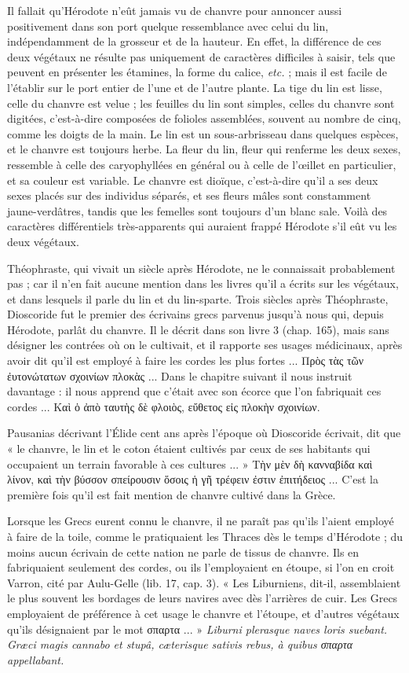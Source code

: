\documentclass[a4paper, 11pt, oneside, polutonikogreek]{article}
\begin{document}
Il fallait qu'Hérodote n'eût jamais vu de chanvre pour annoncer aussi positivement dans son port quelque ressemblance avec celui du lin, indépendamment de la grosseur et de la hauteur. En effet, la différence de ces deux végétaux ne résulte pas uniquement de caractères difficiles à saisir, tels que peuvent en présenter les étamines, la forme du calice, \emph{etc.} ; mais il est facile de l'établir sur le port entier de l'une et de l'autre plante. La tige du lin est lisse, celle du chanvre est velue ; les feuilles du lin sont simples, celles du chanvre sont digitées, c'est-à-dire composées de folioles assemblées, souvent au nombre de cinq, comme les doigts de la main. Le lin est un sous-arbrisseau dans quelques espèces, et le chanvre est toujours herbe. La fleur du lin, fleur qui renferme les deux sexes, ressemble à celle des caryophyllées en général ou à celle de l'œillet en particulier, et sa couleur est variable. Le chanvre est dioïque, c'est-à-dire qu'il a ses deux sexes placés sur des individus séparés, et ses fleurs mâles sont constamment jaune-verdâtres, tandis que les femelles sont toujours d'un blanc sale. Voilà des caractères différentiels très-apparents qui auraient frappé Hérodote s'il eût vu les deux végétaux.

Théophraste, qui vivait un siècle après Hérodote, ne le connaissait probablement pas ; car il n'en fait aucune mention dans les livres qu'il a écrits sur les végétaux, et dans lesquels il parle du lin et du lin-sparte. Trois siècles après Théophraste, Dioscoride fut le premier des écrivains grecs parvenus jusqu'à nous qui, depuis Hérodote, parlât du chanvre. Il le décrit dans son livre 3 (chap. 165), mais sans désigner les contrées où on le cultivait, et il rapporte ses usages médicinaux, après avoir dit qu'il est employé à faire les cordes les plus fortes ... Πρὸς τὰς τῶν ἐυτονώτατων σχοινίων πλοκὰς ... Dans le chapitre suivant il nous instruit davantage : il nous apprend que c'était avec son écorce que l'on fabriquait ces cordes ... Καὶ ὁ ἀπὸ ταυτὴς δὲ φλοιὸς, εὔθετος εἰς πλοκὴν σχοινίων.

Pausanias décrivant l'Élide cent ans après l'époque où Dioscoride écrivait, dit que « le chanvre, le lin et le coton étaient cultivés par ceux de ses habitants qui occupaient un terrain favorable à ces cultures ... » Τὴν μὲν δὴ κανναβίδα καὶ λίνον, καὶ τὴν βύσσον σπείρουσιν ὅσοις ἡ γῆ τρέφειν ἐστιν ἐπιτήδειος ... C'est la première fois qu'il est fait mention de chanvre cultivé dans la Grèce.

Lorsque les Grecs eurent connu le chanvre, il ne paraît pas qu'ils l'aient employé à faire de la toile, comme le pratiquaient les Thraces dès le temps d'Hérodote ; du moins aucun écrivain de cette nation ne parle de tissus de chanvre. Ils en fabriquaient seulement des cordes, ou ils l'employaient en étoupe, si l'on en croit Varron, cité par Aulu-Gelle (lib. 17, cap. 3). « Les Liburniens, dit-il, assemblaient le plus souvent les bordages de leurs navires avec dès l’arrières de cuir. Les Grecs employaient de préférence à cet usage le chanvre et l'étoupe, et d'autres végétaux qu'ils désignaient par le mot σπαρτα ... » \emph{Liburni plerasque naves loris suebant. Græci magis cannabo et stupâ, cæterisque sativis rebus, à quibus σπαρτα appellabant.}
\end{document}
